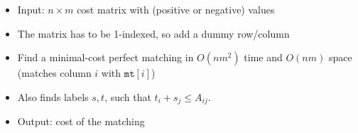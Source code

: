 \begin{itemize}
	\item Input: $n\times m$ cost matrix with (positive or negative) values
	\item The matrix has to be 1-indexed, so add a dummy row/column
	\item Find a minimal-cost perfect matching in $O(nm^2)$ time and $O(nm)$ space (matches column $i$ with $\mathtt{mt}[i]$)
  \item Also finds labels $s, t$, such that $t_i + s_j \leq A_{ij}$.
	\item Output: cost of the matching
\end{itemize}
